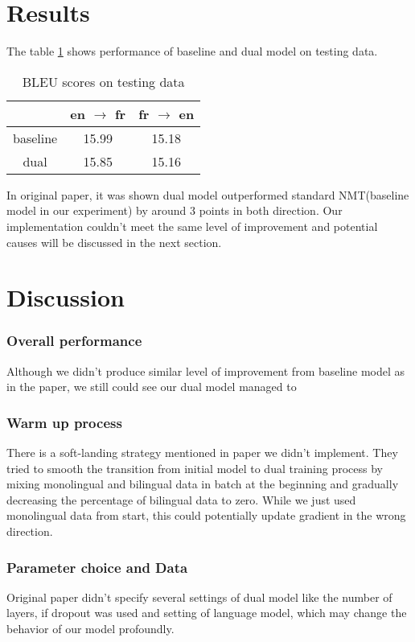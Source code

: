\documentclass[11pt]{article}
\begin{document}
{\part{Results}
The table \ref{table:1} shows performance of baseline and dual model on testing data. 
\begin{table}
\begin{center}
 \begin{tabular}{||c c c||} 
 \hline
  & en $\to$ fr & fr $\to$ en \\ [0.5ex] 
 \hline\hline
 baseline & 15.99 & 15.18 \\
  \hline
 dual & 15.85 & 15.16 \\
  \hline
\end{tabular}
 \caption{BLEU scores on testing data}
\label{table:1}
\end{center}
\end{table}

In original paper\cite{he2016dual}, it was shown dual model outperformed standard NMT(baseline model in our experiment) by around 3 points in both direction. Our implementation couldn't meet the same level of improvement and potential causes will be discussed in the next section.
\part{Discussion}
\section{Overall performance}
Although we didn't produce similar level of improvement from baseline model as in the paper, we still could see our dual model managed to 

\section{Warm up process}
There is a soft-landing strategy mentioned in paper we didn't implement. They tried to smooth the transition from initial model to dual training process by mixing monolingual and bilingual data in batch at the beginning and gradually decreasing the percentage of bilingual data to zero. While we just used monolingual data from start, this could potentially update gradient in the wrong direction.
\section{Parameter choice and Data}
Original paper didn't specify several settings of dual model like the number of layers, if dropout was used and setting of language model, which may change the behavior of our model profoundly.

}
\end{document}
